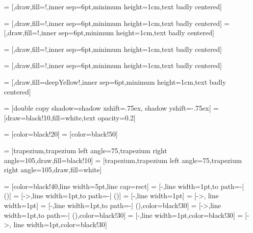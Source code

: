 = [\groupShape,draw,fill=\optimizationColor!\fillOpacity,inner sep=6pt,minimum height=1cm,text badly centered]

 = [\groupShape,draw,fill=\customColor!\fillOpacity,inner sep=6pt,minimum height=1cm,text badly centered]
 = [\groupShape,draw,fill=\implicitColor!\fillOpacity,inner sep=6pt,minimum height=1cm,text badly centered]

 = [\funcShape,draw,fill=\FuncFluidColor!\fillOpacityTwo,inner sep=6pt,minimum height=1cm,text badly centered]

 = [\funcShape,draw,fill=\FuncSolidColor!\fillOpacityTwo,inner sep=6pt,minimum height=1cm,text badly centered]


 = [\compShape,draw,fill=deepYellow!\fillOpacity,inner sep=6pt,minimum height=1cm,text badly centered]

 = [double copy shadow={shadow xshift=.75ex, shadow yshift=-.75ex}]
 = [draw=black!10,fill=white,text opacity=0.2]

 = [color=black!20]
 = [color=black!50]

\newcommand{\dataRightAngle}{105}
\newcommand{\dataLeftAngle}{75}

 = [trapezium,trapezium left angle=\dataLeftAngle,trapezium right angle=\dataRightAngle,draw,fill=black!10]
 = [trapezium,trapezium left angle=\dataLeftAngle,trapezium right angle=\dataRightAngle,draw,fill=white]

 = [color=black!40,line width=5pt,line cap=rect]
 = [-,line width=1pt,to path={-| (\tikztotarget)}]
 = [->,line width=1pt,to path={-| (\tikztotarget)}]
 = [-,line width=1pt]
 = [->, line width=1pt]
 = [-,line width=1pt,to path={-| (\tikztotarget)},color=black!30]
 = [->,line width=1pt,to path={-| (\tikztotarget)},color=black!30]
 = [-,line width=1pt,color=black!30]
 = [->, line width=1pt,color=black!30]

